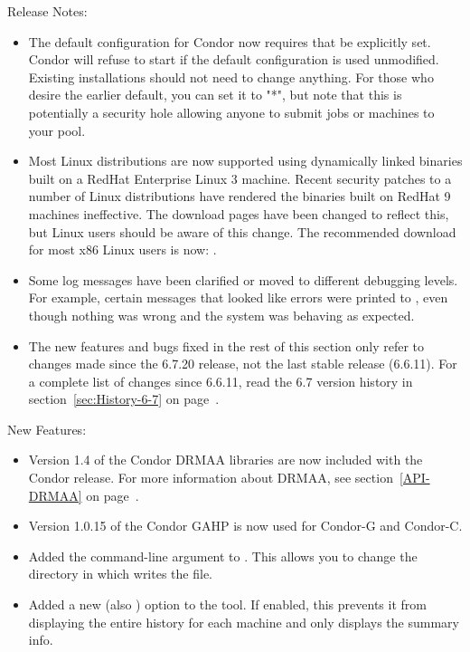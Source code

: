 \noindent Release Notes:

\begin{itemize}

\item The default configuration for Condor now requires that
 be explicitly set.  Condor will refuse
to start if the default configuration is used unmodified.
Existing installations should not need to change anything.  For
those who desire the earlier default, you can set it to "*", but
note that this is potentially a security hole allowing anyone to
submit jobs or machines to your pool.

\item Most Linux distributions are now supported using dynamically
  linked binaries built on a RedHat Enterprise Linux 3 machine.
  Recent security patches to a number of Linux distributions have
  rendered the binaries built on RedHat 9 machines ineffective.
  The download pages have been changed to reflect this, but Linux users
  should be aware of this change.
  The recommended download for most x86 Linux users is now:
  .

\item Some log messages have been clarified or moved to different
  debugging levels.
  For example, certain messages that looked like errors were printed
  to , even though nothing was wrong and the system was
  behaving as expected.

\item The new features and bugs fixed in the rest of this section only
  refer to changes made since the 6.7.20 release, not the last stable
  release (6.6.11).
  For a complete list of changes since 6.6.11, read the 6.7 version
  history in section~\ref{sec:History-6-7} on
  page~\pageref{sec:History-6-7}. 

\end{itemize}


\noindent New Features:

\begin{itemize}

\item Version 1.4 of the Condor DRMAA libraries are now included 
  with the Condor release.
  For more information about DRMAA, see section~\ref{API-DRMAA} on
  page~\pageref{API-DRMAA}.

\item Version 1.0.15 of the Condor GAHP is now used for Condor-G and
  Condor-C. 

\item Added the  command-line argument to
.  This allows you to change the directory in which
 writes the  file.

\item Added a new  (also ) option to the
 tool.  If enabled, this prevents it from
displaying the entire history for each machine and only displays the
summary info.

\end{itemize}

